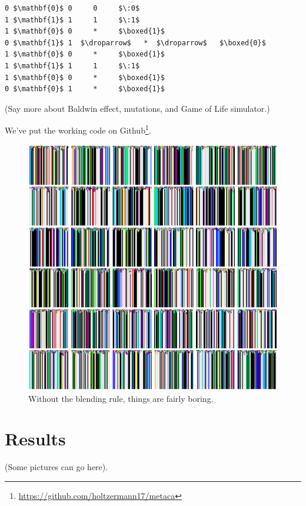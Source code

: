 \documentclass{AISB2008}
\makeatletter
\renewcommand{\boxed}[1]{\text{\fboxsep=.2em\fbox{\m@th$\displaystyle#1$}}}
\newcommand{\droparrow}{%
  \mathchoice{\raisebox{-4pt}{$\displaystyle\mapsto$}}
             {\raisebox{-4pt}{$\mapsto$}}
             {\raisebox{-2pt}{$\scriptstyle\mapsto$}}
             {\raisebox{-2pt}{$\scriptscriptstyle\mapsto$}}}
\makeatother
\begin{document}
\lstset{
  xleftmargin=.3\columnwidth, xrightmargin=.3\columnwidth
}

\begin{lstlisting}[mathescape]
0 $\mathbf{0}$ 0     0     $\:0$
1 $\mathbf{1}$ 1     1     $\:1$
1 $\mathbf{0}$ 0     *     $\boxed{1}$
0 $\mathbf{1}$ 1  $\droparrow$   *  $\droparrow$   $\boxed{0}$
1 $\mathbf{0}$ 0     *     $\boxed{1}$
1 $\mathbf{1}$ 1     1     $\:1$
1 $\mathbf{0}$ 0     *     $\boxed{1}$
0 $\mathbf{0}$ 1     *     $\boxed{1}$
\end{lstlisting}

(Say more about Baldwin effect, mutations, and Game of Life
simulator.)

We've put the working code on Github\footnote{\url{https://github.com/holtzermann17/metaca}}. 


\newpage

\begin{figure}
\includegraphics[width=\columnwidth]{paint-drips.png}
\caption{Without the blending rule, things are fairly boring.}
\end{figure}
\clearpage

\section{Results}
(Some pictures can go here).
\end{document}
